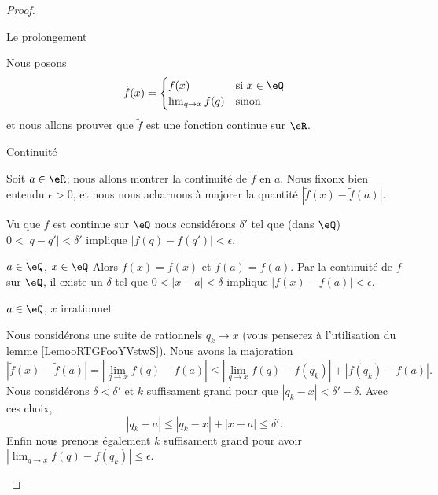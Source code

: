 \begin{proof}
\begin{subproof}
    \item[Le prolongement]

        Nous posons
        \begin{equation}
            \tilde f(x)=\begin{cases}
                f(x)    &   \text{si } x\in \eQ\\
                \lim_{q\to x} f(q)    &    \text{sinon }
            \end{cases}
        \end{equation}
        et nous allons prouver que \( \tilde f\) est une fonction continue sur \( \eR\).

    \item[Continuité]

        Soit \( a\in \eR\); nous allons montrer la continuité de \( \tilde f\) en \( a\). Nous fixonx bien entendu \( \epsilon>0\), et nous nous acharnons à majorer la quantité \( | \tilde f(x)-\tilde f(a) |\).

        Vu que \( f\) est continue sur \( \eQ\) nous considérons \( \delta'\) tel que (dans \( \eQ\)) \( 0<| q-q' |<\delta'\) implique \( | f(q)-f(q') |<\epsilon\).

        \begin{subproof}
            \item[\( a\in \eQ\), \( x\in \eQ\)]
                Alors \( \tilde f(x)=f(x)\) et \( \tilde f(a)=f(a)\). Par la continuité de \( f\) sur \( \eQ\), il existe un \( \delta\) tel que \( 0<| x-a |<\delta\) implique \( | f(x)-f(a) |<\epsilon\).

            \item[\( a\in \eQ\), \( x\) irrationnel]

                Nous considérons une suite de rationnels \( q_k\to x\) (vous penserez à l'utilisation du lemme \ref{LemooRTGFooYVstwS}). Nous avons la majoration
                \begin{equation}        \label{EQooPDEMooHlwTcm}
                    | \tilde f(x)-\tilde f(a) |=| \lim_{q\to x} f(q)-f(a) |\leq | \lim_{q\to x} f(q)-f(q_k) |+| f(q_k)-f(a) |.
                \end{equation}
                Nous considérons \( \delta<\delta'\) et \( k\) suffisament grand pour que \( | q_k-x |<\delta'-\delta\). Avec ces choix,
                \begin{equation}
                    | q_k-a |\leq | q_k-x |+| x-a |\leq \delta'.
                \end{equation}
                Enfin nous prenons également \( k\) suffisament grand pour avoir \( | \lim_{q\to x} f(q)-f(q_k) |\leq \epsilon\).


\end{subproof}
\end{subproof}
\end{proof}
